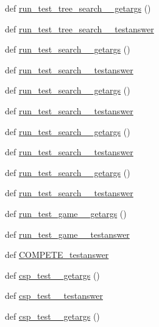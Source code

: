 \begin{DoxyCompactItemize}
\item 
def \hyperlink{namespacetests_a476af4a1ea4ae39c95efd0f478637dfe}{run\+\_\+test\+\_\+tree\+\_\+search\+\_\+\_\+getargs} ()
\item 
def \hyperlink{namespacetests_abc56bb5312805b34333c12a49cf9dceb}{run\+\_\+test\+\_\+tree\+\_\+search\+\_\+\_\+testanswer}
\item 
def \hyperlink{namespacetests_a3b51717eaa02db908d997608b8f3c7e8}{run\+\_\+test\+\_\+search\+\_\+\_\+getargs} ()
\item 
def \hyperlink{namespacetests_a4f867c2377fa17fbe40bb2350bf22291}{run\+\_\+test\+\_\+search\+\_\+\_\+testanswer}
\item 
def \hyperlink{namespacetests_aa5268329c73a8443999f217ee98db938}{run\+\_\+test\+\_\+search\+\_\+\_\+getargs} ()
\item 
def \hyperlink{namespacetests_ab1e40bae979353ba8619b141cd026d17}{run\+\_\+test\+\_\+search\+\_\+\_\+testanswer}
\item 
def \hyperlink{namespacetests_a4449db930a335b88849bd815126cc34d}{run\+\_\+test\+\_\+search\+\_\+\_\+getargs} ()
\item 
def \hyperlink{namespacetests_a5ab2a8a4af218997759fffe233b2bcc1}{run\+\_\+test\+\_\+search\+\_\+\_\+testanswer}
\item 
def \hyperlink{namespacetests_a16110800dc40bbe9138c7be7bfd8c075}{run\+\_\+test\+\_\+search\+\_\+\_\+getargs} ()
\item 
def \hyperlink{namespacetests_a21596f2d788333d8bee51c3f1fb85d9f}{run\+\_\+test\+\_\+search\+\_\+\_\+testanswer}
\item 
def \hyperlink{namespacetests_a4d2b8ca68883e86d691e2be99602322b}{run\+\_\+test\+\_\+game\+\_\+\_\+getargs} ()
\item 
def \hyperlink{namespacetests_a4e4412fcc7ccabef1d7dbdab1ceb3ce5}{run\+\_\+test\+\_\+game\+\_\+\_\+testanswer}
\item 
def \hyperlink{namespacetests_a75639bbe216bc0814b7ce89dd5f932a1}{C\+O\+M\+P\+E\+T\+E\+\_\+testanswer}
\item 
def \hyperlink{namespacetests_acd8e9c9c93eaa014fa917bed178af89a}{csp\+\_\+test\+\_\+\_\+getargs} ()
\item 
def \hyperlink{namespacetests_a43b5ac89364974dbf8512e38cb51ed4a}{csp\+\_\+test\+\_\+\_\+testanswer}
\item 
def \hyperlink{namespacetests_a3f3e5ca1f79b185e2eac7ff9a97da52a}{csp\+\_\+test\+\_\+\_\+getargs} ()
\item 

\end{DoxyCompactItemize}
